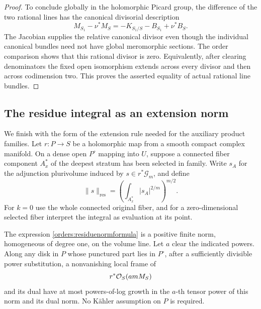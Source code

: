 \begin{proof}
To conclude globally in the holomorphic Picard group, the
difference of the two rational lines has the canonical
divisorial description
\[
 M_{S_1}-\nu^*M_S
   =-K_{S_1/S}-B_{S_1}+\nu^*B_S.
\]
The Jacobian supplies the relative canonical divisor even
though the individual canonical bundles need not have global
meromorphic sections.  The order comparison shows that this
rational divisor is zero.  Equivalently, after clearing
denominators the fixed open isomorphism extends across every
divisor and then across codimension two.  This proves the
asserted equality of actual rational line bundles.
\end{proof}

\subsection{The residue integral as an extension norm}
\label{orders:residuenormsection}

We finish with the form of the extension rule needed for the
auxiliary product families.  Let \(r:P\to S\) be a holomorphic
map from a smooth compact complex manifold.  On a dense open
\(P^\circ\) mapping into \(U\), suppose a connected fiber
component \(A_x^*\) of the deepest stratum has been selected
in family.  Write \(s_A\) for the adjunction plurivolume
induced by \(s\in r^*\mathcal G_m\), and define
\begin{equation}
 \|s\|_{\mathrm{res}}
      =\left(\int_{A_x^*}|s_A|^{2/m}\right)^{m/2}.
 \label{orders:residuenormformula}
\end{equation}
For \(k=0\) use the whole connected original fiber, and for a
zero-dimensional selected fiber interpret the integral as
evaluation at its point.

\begin{corollary}
\label{orders:residuenorm}
The expression \eqref{orders:residuenormformula} is a positive
finite norm, homogeneous of degree one, on the volume line.
Let \(a\) clear the indicated powers.  Along any disk in \(P\)
whose punctured part lies in \(P^\circ\), after a sufficiently
divisible power substitution, a nonvanishing local frame of
\[
                        r^*\mathcal O_S(amM_S)
\]
and its dual have at most powers-of-log growth in the \(a\)-th
tensor power of this norm and its dual norm.  No K\"ahler
assumption on \(P\) is required.
\end{corollary}

